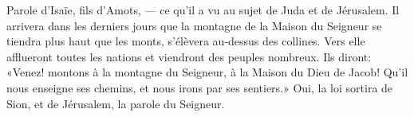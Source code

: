 Parole d’Isaïe, fils d’Amots,
	--- ce qu’il a vu au sujet de Juda et de Jérusalem.
Il arrivera dans les derniers jours
	que la montagne de la Maison du Seigneur se tiendra plus haut que les monts,
	s’élèvera au-dessus des collines.
Vers elle afflueront toutes les nations et viendront des peuples nombreux.
	Ils diront: «Venez! montons à la montagne du Seigneur, à la Maison du Dieu de Jacob!
	Qu’il nous enseigne ses chemins, et nous irons par ses sentiers.»
Oui, la loi sortira de Sion, et de Jérusalem, la parole du Seigneur.
